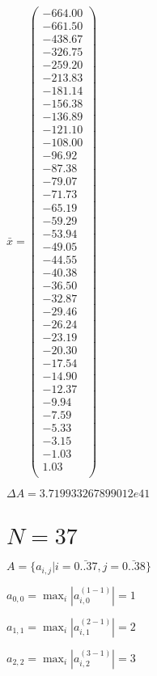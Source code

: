 \documentclass[a4paper,12pt]{article}
\begin{document}
$\bar { x } = \begin{pmatrix}
-664.00 \\
-661.50 \\
-438.67 \\
-326.75 \\
-259.20 \\
-213.83 \\
-181.14 \\
-156.38 \\
-136.89 \\
-121.10 \\
-108.00 \\
-96.92 \\
-87.38 \\
-79.07 \\
-71.73 \\
-65.19 \\
-59.29 \\
-53.94 \\
-49.05 \\
-44.55 \\
-40.38 \\
-36.50 \\
-32.87 \\
-29.46 \\
-26.24 \\
-23.19 \\
-20.30 \\
-17.54 \\
-14.90 \\
-12.37 \\
-9.94 \\
-7.59 \\
-5.33 \\
-3.15 \\
-1.03 \\
1.03 \\
\end{pmatrix}
$

$\Delta A = 3.719933267899012e41$



\section{ $N = 37$ }
$A = \{ a _{ i, j } | i = \bar { 0..37 }, j = \bar { 0..38 } \}$

$a _{ 0, 0 } =  \max _i |a _{ i, 0 } ^{ (1 - 1) } | = 1$

$a _{ 1, 1 } =  \max _i |a _{ i, 1 } ^{ (2 - 1) } | = 2$

$a _{ 2, 2 } =  \max _i |a _{ i, 2 } ^{ (3 - 1) } | = 3$
\end{document}
